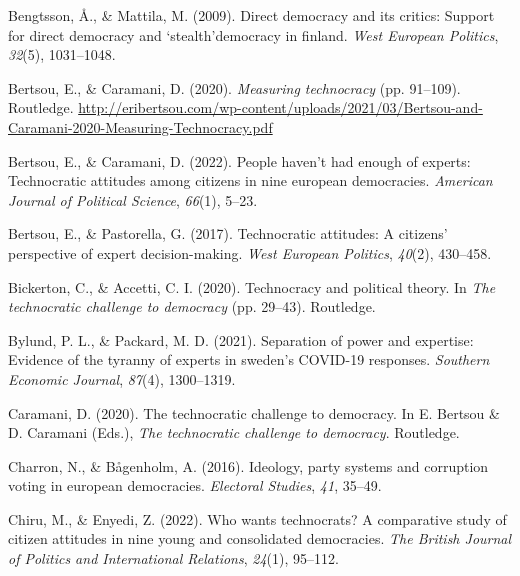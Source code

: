 \documentclass[
  12pt,
  english,
]{article}
\newlength{\cslhangindent}
\newlength{\cslentryspacingunit} %
\newenvironment{CSLReferences}[2] %
 {%
  \setlength{\parindent}{0pt}
  \ifodd #1
  \let\oldpar\par
  \def\par{\hangindent=\cslhangindent\oldpar}
  \fi
  \setlength{\parskip}{#2\cslentryspacingunit}
 }%
 {}
\begin{document}
\hypertarget{refs}{}
\begin{CSLReferences}{1}{0}
\leavevmode{}%
Bengtsson, Å., \& Mattila, M. (2009). Direct democracy and its critics:
Support for direct democracy and `stealth'democracy in finland.
\emph{West European Politics}, \emph{32}(5), 1031--1048.

\leavevmode{}%
Bertsou, E., \& Caramani, D. (2020). \emph{Measuring technocracy} (pp.
91--109). Routledge.
\url{http://eribertsou.com/wp-content/uploads/2021/03/Bertsou-and-Caramani-2020-Measuring-Technocracy.pdf}

\leavevmode{}%
Bertsou, E., \& Caramani, D. (2022). People haven't had enough of
experts: Technocratic attitudes among citizens in nine european
democracies. \emph{American Journal of Political Science}, \emph{66}(1),
5--23.

\leavevmode{}%
Bertsou, E., \& Pastorella, G. (2017). Technocratic attitudes: A
citizens' perspective of expert decision-making. \emph{West European
Politics}, \emph{40}(2), 430--458.

\leavevmode{}%
Bickerton, C., \& Accetti, C. I. (2020). Technocracy and political
theory. In \emph{The technocratic challenge to democracy} (pp. 29--43).
Routledge.

\leavevmode{}%
Bylund, P. L., \& Packard, M. D. (2021). Separation of power and
expertise: Evidence of the tyranny of experts in sweden's COVID-19
responses. \emph{Southern Economic Journal}, \emph{87}(4), 1300--1319.

\leavevmode{}%
Caramani, D. (2020). The technocratic challenge to democracy. In E.
Bertsou \& D. Caramani (Eds.), \emph{The technocratic challenge to
democracy}. Routledge.

\leavevmode{}%
Charron, N., \& Bågenholm, A. (2016). Ideology, party systems and
corruption voting in european democracies. \emph{Electoral Studies},
\emph{41}, 35--49.

\leavevmode{}%
Chiru, M., \& Enyedi, Z. (2022). Who wants technocrats? A comparative
study of citizen attitudes in nine young and consolidated democracies.
\emph{The British Journal of Politics and International Relations},
\emph{24}(1), 95--112.


\end{CSLReferences}
\end{document}
